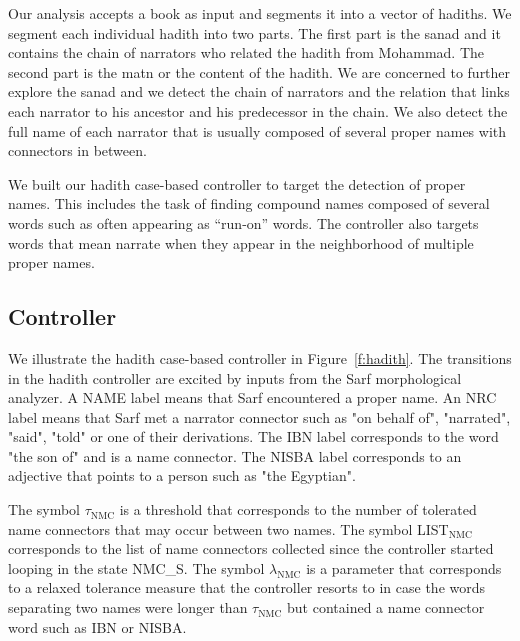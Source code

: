 \documentclass[11pt]{article}
\begin{document}

Our analysis accepts a book as input
and segments it into a vector of hadiths. 
We segment each individual hadith into two parts. 
The first part is the sanad and it
contains the chain of narrators who related the hadith
from Mohammad. 
The second part is the matn or the content
of the hadith. 
We are concerned to further explore the sanad and
we detect the chain of narrators and 
the relation that links each narrator to his ancestor and 
his predecessor in the chain. 
We also detect the full name of each narrator that is
usually composed of several proper names with connectors
in between. 

We built our hadith case-based controller to target
the detection of proper names. 
This includes the task of finding compound names 
composed of several words such as  often
appearing as ``run-on'' words.
The controller also targets words that mean narrate when
they appear in the neighborhood of multiple proper names. 

\subsection{Controller}
\label{sec:controller}

We illustrate the hadith case-based controller 
in Figure~\ref{f:hadith}. 
The transitions in the hadith controller are excited
by inputs from the Sarf morphological analyzer. 
A NAME label means that Sarf encountered a proper name.
An NRC label means that Sarf met a narrator connector such as
 "on behalf of",  "narrated",  "said", 
 "told" or one of their derivations. 
The IBN label corresponds to the word  "the son of" and is a name connector.
The NISBA label corresponds to an adjective that points to a person such 
as  "the Egyptian". 

The symbol $\tau_{\mbox{NMC}}$ is a threshold
that corresponds to the number of tolerated name connectors 
that may occur between two names. 
The symbol LIST$_{\mbox{NMC}}$ corresponds to the list 
of name connectors collected since the controller
started looping in the state NMC\_S. 
The symbol $\lambda_{\mbox{NMC}}$ is a parameter 
that corresponds to a relaxed tolerance measure that
the controller resorts to in case the words separating
two names were longer than $\tau_{\mbox{NMC}}$ but 
contained a name connector word such as IBN or NISBA.
\end{document}
